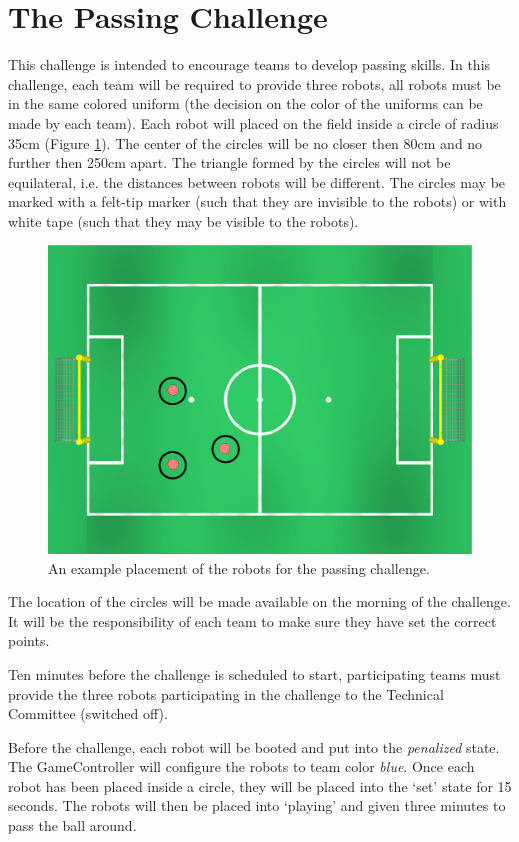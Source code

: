 \documentclass{article}
\begin{document}
\section{The Passing Challenge}
\label{sec:passing}
This challenge is intended to encourage teams to develop passing skills. In this challenge,
each team will be required to provide three robots, all robots must be in the same
colored uniform (the decision on the color of the uniforms can be made by each team).
Each robot will placed on the field inside a circle of radius 35cm (Figure \ref{fig:passing}). The center 
of the circles will be no closer then 80cm and no further then 250cm apart. The triangle formed 
by the circles will not be equilateral, i.e. the distances between robots will be different.  
The circles may be marked with a felt-tip marker (such that they are invisible to the robots) or 
with white tape (such that they may be visible to the robots).

\begin{figure}[htb]
\centering
\includegraphics[width=0.6\linewidth]{figures/passing.eps}
\caption{An example placement of the robots for the passing challenge.}
\label{fig:passing}
\end{figure}

The location of the circles will be made available on the morning of the challenge.
It will be the responsibility of each team to make sure they have set the correct points.

Ten minutes before the challenge is scheduled to start, participating teams must
provide the three robots participating in the challenge to the Technical Committee 
(switched off).

Before the challenge, each robot will be booted and put into the \emph{penalized} 
state. The GameController will configure the robots to team color \emph{blue}.  Once each 
robot has been placed inside a circle, they will be placed into the `set' state for 
15 seconds. The robots will then be placed into `playing' and given three minutes to 
pass the ball around.
\end{document}
